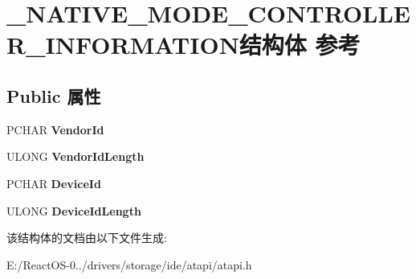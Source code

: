 \hypertarget{struct___n_a_t_i_v_e___m_o_d_e___c_o_n_t_r_o_l_l_e_r___i_n_f_o_r_m_a_t_i_o_n}{}\section{\+\_\+\+N\+A\+T\+I\+V\+E\+\_\+\+M\+O\+D\+E\+\_\+\+C\+O\+N\+T\+R\+O\+L\+L\+E\+R\+\_\+\+I\+N\+F\+O\+R\+M\+A\+T\+I\+O\+N结构体 参考}
\label{struct___n_a_t_i_v_e___m_o_d_e___c_o_n_t_r_o_l_l_e_r___i_n_f_o_r_m_a_t_i_o_n}
\subsection*{Public 属性}
\begin{DoxyCompactItemize}
\item 
\mbox{\label{struct___n_a_t_i_v_e___m_o_d_e___c_o_n_t_r_o_l_l_e_r___i_n_f_o_r_m_a_t_i_o_n_a324038f9e94aa043ab9eec69d2435e5e}} 
P\+C\+H\+AR {\bfseries Vendor\+Id}
\item 
\mbox{\label{struct___n_a_t_i_v_e___m_o_d_e___c_o_n_t_r_o_l_l_e_r___i_n_f_o_r_m_a_t_i_o_n_aea4d6cb50bad7b8bbec5eed5341cd6e0}} 
U\+L\+O\+NG {\bfseries Vendor\+Id\+Length}
\item 
\mbox{\label{struct___n_a_t_i_v_e___m_o_d_e___c_o_n_t_r_o_l_l_e_r___i_n_f_o_r_m_a_t_i_o_n_a925caeb9962ea43a07af2c3d7694a1df}} 
P\+C\+H\+AR {\bfseries Device\+Id}
\item 
\mbox{\label{struct___n_a_t_i_v_e___m_o_d_e___c_o_n_t_r_o_l_l_e_r___i_n_f_o_r_m_a_t_i_o_n_a68f774c32c343b509997531ebe3dffb4}} 
U\+L\+O\+NG {\bfseries Device\+Id\+Length}
\end{DoxyCompactItemize}


该结构体的文档由以下文件生成\+:\begin{DoxyCompactItemize}
\item 
E\+:/\+React\+O\+S-\/0../drivers/storage/ide/atapi/atapi.\+h\end{DoxyCompactItemize}
